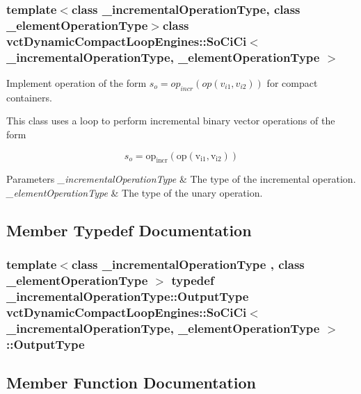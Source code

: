 \subsubsection*{template$<$class \+\_\+incremental\+Operation\+Type, class \+\_\+element\+Operation\+Type$>$class vct\+Dynamic\+Compact\+Loop\+Engines\+::\+So\+Ci\+Ci$<$ \+\_\+incremental\+Operation\+Type, \+\_\+element\+Operation\+Type $>$}

Implement operation of the form $s_o = op_{incr}(op(v_{i1}, v_{i2}))$ for compact containers. 

This class uses a loop to perform incremental binary vector operations of the form

\[ s_o = \mathrm{op_{incr}(\mathrm{op}(v_{i1}, v_{i2}))} \]


\begin{DoxyParams}{Parameters}
{\em \+\_\+incremental\+Operation\+Type} & The type of the incremental operation.\\
\hline
{\em \+\_\+element\+Operation\+Type} & The type of the unary operation. \\
\hline
\end{DoxyParams}


\subsection{Member Typedef Documentation}
\hypertarget{classvct_dynamic_compact_loop_engines_1_1_so_ci_ci_ab00f75cd43ad2aa4ca177a1522f73fe2}{}
\subsubsection[{Output\+Type}]{\setlength{\rightskip}{0pt plus 5cm}template$<$class \+\_\+incremental\+Operation\+Type , class \+\_\+element\+Operation\+Type $>$ typedef \+\_\+incremental\+Operation\+Type\+::\+Output\+Type {\bf vct\+Dynamic\+Compact\+Loop\+Engines\+::\+So\+Ci\+Ci}$<$ \+\_\+incremental\+Operation\+Type, \+\_\+element\+Operation\+Type $>$\+::{\bf Output\+Type}}\label{classvct_dynamic_compact_loop_engines_1_1_so_ci_ci_ab00f75cd43ad2aa4ca177a1522f73fe2}


\subsection{Member Function Documentation}
\hypertarget{classvct_dynamic_compact_loop_engines_1_1_so_ci_ci_af8e68cdb182a4db1edcdcc4fa00c545c}{}
